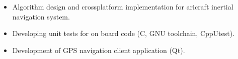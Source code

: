 \documentclass[a4paper,oneside,12pt]{article}
\begin{document}
\begin{itemize}
    \item Algorithm design and crossplatform implementation for aricraft inertial navigation system.
    \item Developing unit tests for on board code (C, GNU toolchain, CppUtest).
    \item Development of GPS navigation client application (Qt). 
\end{itemize}

~\\[-1em]
\end{document}

